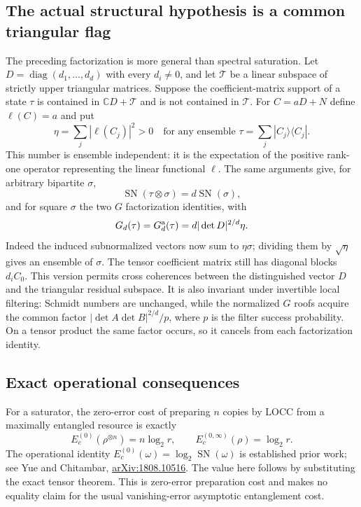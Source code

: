 \subsection{The actual structural hypothesis is a common triangular flag}

The preceding factorization is more general than spectral saturation.
Let $D=\operatorname{diag}(d_1,\ldots,d_d)$ with every $d_i\ne0$, and let
$\mathcal T$ be a linear subspace of strictly upper triangular matrices.
Suppose the coefficient-matrix support of a state $\tau$ is contained in
$\mathbb CD+\mathcal T$ and is not contained in $\mathcal T$.
For $C=aD+N$ define $\ell(C)=a$ and put
\[
       \eta=\sum_j|\ell(C_j)|^2>0
       \quad\text{for any ensemble }\tau=\sum_j|C_j\rangle\langle C_j|.
\]
This number is ensemble independent: it is the expectation of the positive
rank-one operator representing the linear functional $\ell$.
The same arguments give, for arbitrary bipartite $\sigma$,
\[
 \operatorname{SN}(\tau\otimes\sigma)=d\operatorname{SN}(\sigma),
\]
and for square $\sigma$ the two $G$ factorization identities, with
\[
       G_d(\tau)=G_d^{\rm a}(\tau)=d|\det D|^{2/d}\eta.
\]
Indeed the induced subnormalized vectors now sum to $\eta\sigma$;
dividing them by $\sqrt\eta$ gives an ensemble of $\sigma$.
The tensor coefficient matrix still has diagonal blocks $d_iC_0$.
This version permits cross coherences between the distinguished vector
$D$ and the triangular residual subspace. It is also invariant under
invertible local filtering: Schmidt numbers are unchanged, while the
normalized $G$ roofs acquire the common factor
$|\det A\det B|^{2/d}/p$, where $p$ is the filter success probability.
On a tensor product the same factor occurs, so it cancels from each
factorization identity.

\subsection{Exact operational consequences}

For a saturator, the zero-error cost of preparing $n$ copies by LOCC from
a maximally entangled resource is exactly
\[
       E_c^{(0)}(\rho^{\otimes n})=n\log_2 r,
       \qquad E_c^{(0,\infty)}(\rho)=\log_2 r.
\]
The operational identity $E_c^{(0)}(\omega)=\log_2\operatorname{SN}(\omega)$
is established prior work; see Yue and Chitambar,
\href{https://arxiv.org/abs/1808.10516}{arXiv:1808.10516}.
The value here follows by substituting the exact tensor theorem.
This is zero-error preparation cost and makes no equality claim for the
usual vanishing-error asymptotic entanglement cost.

